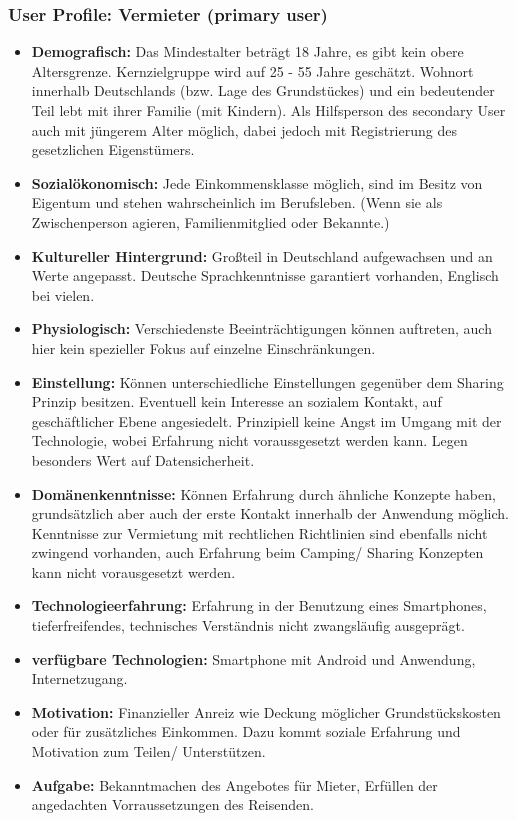 \subsubsection{User Profile: Vermieter (primary user)}
\begin{itemize}
   \item 
   \textbf{Demografisch:} Das Mindestalter beträgt 18 Jahre, es gibt kein obere Altersgrenze. Kernzielgruppe wird auf 25 - 55 Jahre geschätzt. Wohnort innerhalb Deutschlands (bzw. Lage des Grundstückes) und ein bedeutender Teil lebt mit ihrer Familie (mit Kindern). Als Hilfsperson des secondary User auch mit jüngerem Alter möglich, dabei jedoch mit Registrierung des gesetzlichen Eigenstümers.

   \item 
  \textbf{Sozialökonomisch:} Jede Einkommensklasse möglich, sind im Besitz von Eigentum und stehen wahrscheinlich im Berufsleben. (Wenn sie als Zwischenperson agieren, Familienmitglied oder Bekannte.)

   \item 
   \textbf{Kultureller Hintergrund:} Großteil in Deutschland aufgewachsen und an Werte angepasst. Deutsche Sprachkenntnisse garantiert vorhanden, Englisch bei vielen.

   \item
  \textbf{Physiologisch:} Verschiedenste Beeinträchtigungen können auftreten, auch hier kein spezieller Fokus auf einzelne Einschränkungen.

   \item 
   \textbf{Einstellung:} Können unterschiedliche Einstellungen gegenüber dem Sharing Prinzip besitzen. Eventuell kein Interesse an sozialem Kontakt, auf geschäftlicher Ebene angesiedelt. Prinzipiell keine Angst im Umgang mit der Technologie, wobei Erfahrung nicht voraussgesetzt werden kann. Legen besonders Wert auf Datensicherheit.

   \item 
   \textbf{Domänenkenntnisse:} Können Erfahrung durch ähnliche Konzepte haben, grundsätzlich aber auch der erste Kontakt innerhalb der Anwendung möglich. Kenntnisse zur Vermietung mit rechtlichen Richtlinien sind ebenfalls nicht zwingend vorhanden, auch Erfahrung beim Camping/ Sharing Konzepten kann nicht vorausgesetzt werden.

   \item
   \textbf{Technologieerfahrung:} Erfahrung in der Benutzung eines Smartphones, tieferfreifendes, technisches Verständnis nicht zwangsläufig ausgeprägt.

   \item
   \textbf{verfügbare Technologien:} Smartphone mit Android und Anwendung, Internetzugang.

   \item
   \textbf{Motivation:} Finanzieller Anreiz wie Deckung möglicher Grundstückskosten oder für zusätzliches Einkommen. Dazu kommt soziale Erfahrung und Motivation zum Teilen/ Unterstützen.

   \item
   \textbf{Aufgabe:} Bekanntmachen des Angebotes für Mieter, Erfüllen der angedachten Vorraussetzungen des Reisenden.
   
\end{itemize}
